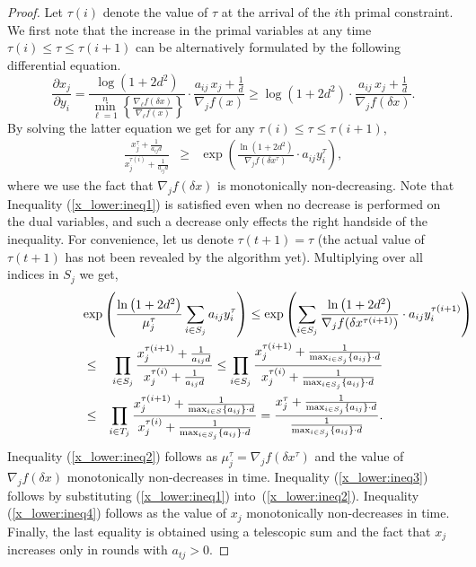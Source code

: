 \documentclass[letterpaper,11pt]{article}
\begin{document}
\begin{proof}
Let $\tau(i)$ denote the value of $\tau$ at the arrival of the $i$th primal constraint. We first note that the increase in the primal variables at any time $\tau(i) \leq \tau \leq \tau(i+1)$ can be alternatively formulated by the following differential equation.
\begin{equation} \label{differential:xy}
\frac{\partial x_j}{\partial y_i}=  \frac{\log\left(1+ 2d^2\right)}{\min_{\ell=1}^{n}\left\{\frac{\nabla_\ell f(\delta x)}{\nabla_\ell f(x)}\right\}}\cdot\frac{a_{i j}\,x_j + \frac{1}{d}}{\nabla_j f(x)} \geq \log\left(1+ 2d^2\right)\cdot\frac{a_{i j}\,x_j + \frac{1}{d}}{\nabla_j f(\delta x)}.
\end{equation}
By solving the latter equation we get for any $\tau(i) \leq \tau \leq \tau(i+1)$,
\begin{eqnarray}
\frac{x_j^{\tau} + \frac{1}{a_{ij}d}}{x_j^{\tau(i)} + \frac{1}{a_{ij}d}} & \geq & \exp\left(\frac{\ln\left(1+2d^2\right)}{\nabla_j f(\delta x^\tau)}\cdot a_{ij}y^{\tau}_i\right) \label{x_lower:ineq1},
\end{eqnarray}
where we use the fact that $\nabla_j f(\delta x)$ is monotonically non-decreasing. Note that Inequality (\ref{x_lower:ineq1}) is satisfied even when no decrease is performed on the dual variables, and such a decrease only effects the right handside of the inequality.
For convenience, let us denote $\tau(t+1)=\tau$ (the actual value of $\tau(t+1)$ has not been revealed by the algorithm yet). Multiplying over all indices in $S_j$ we get,
\begin{eqnarray}
\lefteqn{\exp\left(\frac{\ln\left(1+2d^2\right)}{\mu_j^{\tau}} \sum_{i\in S_j} a_{ij}y^{\tau}_i\right) \leq \exp\left( \sum_{i\in S_j} \frac{\ln\left(1+2d^2\right)}{\nabla_j f(\delta x^{\tau(i+1)})} \cdot a_{ij}y^{\tau(i+1)}_i\right)} \label{x_lower:ineq2}\\
& \leq & \prod_{i\in S_j} \frac{x_j^{\tau(i+1)} + \frac{1}{a_{ij}d}}{x_j^{\tau(i)} + \frac{1}{a_{ij}d}}
  \leq   \prod_{i\in S_j} \frac{x_j^{\tau(i+1)} + \frac{1}{\max_{i\in S_j} \{a_{ij}\}\cdot d}}{x_j^{\tau(i)} + \frac{1}{\max_{i\in S_j} \{a_{ij}\}\cdot d}}\label{x_lower:ineq3} \\
& \leq & \prod_{i \in T_j} \frac{x_j^{\tau(i+1)} + \frac{1}{\max_{i\in S} \{a_{ij}\}\cdot d}}{x_j^{\tau(i)} + \frac{1}{\max_{i\in S_j} \{a_{ij}\}\cdot d}} = \frac{x_j^{\tau} + \frac{1}{\max_{i\in S_j} \{a_{ij}\}\cdot d}}{\frac{1}{\max_{i\in S_j} \{a_{ij}\}\cdot d}}\label{x_lower:ineq4} .
\end{eqnarray}
Inequality (\ref{x_lower:ineq2}) follows as $\mu_j^{\tau}=\nabla_j
f(\delta x^{\tau})$ and the value of $\nabla_j f(\delta x)$
monotonically non-decreases in time. Inequality (\ref{x_lower:ineq3})
follows by substituting (\ref{x_lower:ineq1}) into~(\ref{x_lower:ineq2}). Inequality (\ref{x_lower:ineq4}) follows as the value of $x_j$ monotonically non-decreases in time. Finally, the last equality is obtained using a telescopic sum and the fact that $x_j$ increases only in rounds with $a_{tj}>0$.
\end{proof}
\end{document}
